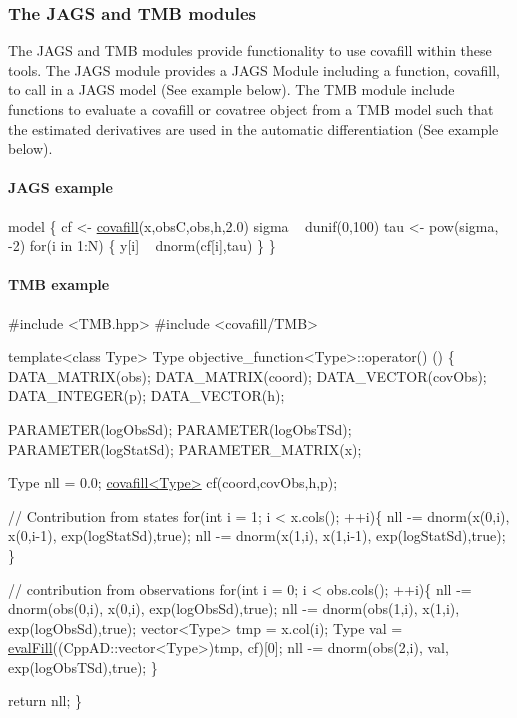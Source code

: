 \subsubsection*{The J\+A\+G\+S and T\+M\+B modules}

The J\+A\+G\+S and T\+M\+B modules provide functionality to use covafill within these tools. The J\+A\+G\+S module provides a J\+A\+G\+S Module including a function, covafill, to call in a J\+A\+G\+S model (See example below). The T\+M\+B module include functions to evaluate a covafill or covatree object from a T\+M\+B model such that the estimated derivatives are used in the automatic differentiation (See example below).

\paragraph*{J\+A\+G\+S example}


\begin{DoxyCode}
model \{
      cf <- \hyperlink{classcovafill}{covafill}(x,obsC,obs,h,2.0)
      sigma ~ dunif(0,100)
      tau <- pow(sigma, -2)
      for(i in 1:N) \{
            y[i] ~ dnorm(cf[i],tau)
        \}
\}
\end{DoxyCode}


\paragraph*{T\+M\+B example}


\begin{DoxyCode}
\textcolor{preprocessor}{#include <TMB.hpp>}
\textcolor{preprocessor}{#include <covafill/TMB>}

\textcolor{keyword}{template}<\textcolor{keyword}{class} Type>
Type objective\_function<Type>::operator() ()
\{
  DATA\_MATRIX(obs);
  DATA\_MATRIX(coord);
  DATA\_VECTOR(covObs);
  DATA\_INTEGER(p);
  DATA\_VECTOR(h);

  PARAMETER(logObsSd);
  PARAMETER(logObsTSd);
  PARAMETER(logStatSd);
  PARAMETER\_MATRIX(x);

  Type nll = 0.0;
  \hyperlink{classcovafill}{covafill<Type>} cf(coord,covObs,h,p);

  \textcolor{comment}{// Contribution from states}
  \textcolor{keywordflow}{for}(\textcolor{keywordtype}{int} i = 1; i < x.cols(); ++i)\{
    nll -= dnorm(x(0,i), x(0,i-1), exp(logStatSd),\textcolor{keyword}{true});
    nll -= dnorm(x(1,i), x(1,i-1), exp(logStatSd),\textcolor{keyword}{true});
  \}

  \textcolor{comment}{// contribution from observations}
  \textcolor{keywordflow}{for}(\textcolor{keywordtype}{int} i = 0; i < obs.cols(); ++i)\{
    nll -= dnorm(obs(0,i), x(0,i), exp(logObsSd),\textcolor{keyword}{true});
    nll -= dnorm(obs(1,i), x(1,i), exp(logObsSd),\textcolor{keyword}{true});
    vector<Type> tmp = x.col(i);
    Type val = \hyperlink{group__tmb_ga0862de227e5abdeba2394525467bafe4}{evalFill}((CppAD::vector<Type>)tmp, cf)[0];
    nll -= dnorm(obs(2,i), val, exp(logObsTSd),\textcolor{keyword}{true});
  \}


  \textcolor{keywordflow}{return} nll;
\}
\end{DoxyCode}
 